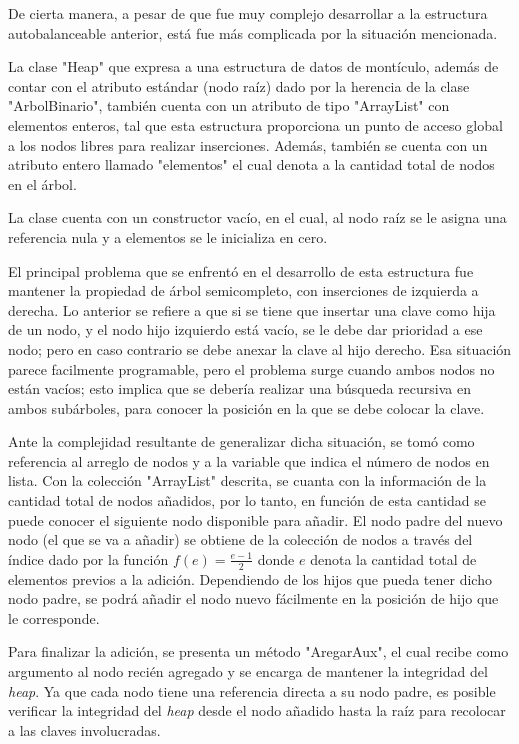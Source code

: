 \documentclass[letterpaper, 11pt]{article}
\begin{document}
	De cierta manera, a pesar de que fue muy complejo desarrollar a la estructura autobalanceable anterior, está fue más complicada por la situación mencionada. 
	
	La clase "Heap" que expresa a una estructura de datos de montículo, además de contar con el atributo estándar (nodo raíz) dado por la herencia de la clase "ArbolBinario", también cuenta con un atributo de tipo "ArrayList" con elementos enteros, tal que esta estructura proporciona un punto de acceso global a los nodos libres para realizar inserciones. Además, también se cuenta con un atributo entero llamado "elementos" el cual denota a la cantidad total de nodos en el árbol.
	
	La clase cuenta con un constructor vacío, en el cual, al nodo raíz se le asigna una referencia nula y a elementos se le inicializa en cero.
	
	El principal problema que se enfrentó en el desarrollo de esta estructura fue mantener la propiedad de árbol semicompleto, con inserciones de izquierda a derecha. Lo anterior se refiere a que si se tiene que insertar una clave como hija de un nodo, y el nodo hijo izquierdo está vacío, se le debe dar prioridad a ese nodo; pero en caso contrario se debe anexar la clave al hijo derecho. Esa situación parece facilmente programable, pero el problema surge cuando ambos nodos no están vacíos; esto implica que se debería realizar una búsqueda recursiva en ambos subárboles, para conocer la posición en la que se debe colocar la clave. 
	
	Ante la complejidad resultante de generalizar dicha situación, se tomó como referencia al arreglo de nodos y a la variable que indica el número de nodos en lista. Con la colección "ArrayList" descrita, se cuanta con la información de la cantidad total de nodos añadidos, por lo tanto, en función de esta cantidad se puede conocer el siguiente nodo disponible para añadir. El nodo padre del nuevo nodo (el que se va a añadir) se obtiene de la colección de nodos a través del índice dado por la función $f(e)=\frac{e-1}{2}$ donde $e$ denota la cantidad total de elementos previos a la adición. Dependiendo de los hijos que pueda tener dicho nodo padre, se podrá añadir el nodo nuevo fácilmente en la posición de hijo que le corresponde. 
	
	Para finalizar la adición, se presenta un método "AregarAux", el cual recibe como argumento al nodo recién agregado y se encarga de mantener la integridad del \textit{heap}. Ya que cada nodo tiene una referencia directa a su nodo padre, es posible verificar la integridad del \textit{heap} desde el nodo añadido hasta la raíz para recolocar a las claves involucradas.
	
\end{document}
